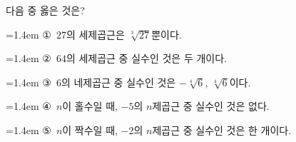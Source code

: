 다음 중 옳은 것은?
\par\medskip\par\noindent\hangindent=1.4em {\small ①}\ $27$의 세제곱근은 $\sqrt[3]{27}$뿐이다.\par\noindent\hangindent=1.4em {\small ②}\ $64$의 세제곱근 중 실수인 것은 두 개이다.\par\noindent\hangindent=1.4em {\small ③}\ $6$의 네제곱근 중 실수인 것은 $-\sqrt[4]{6}$, $\sqrt[4]{6}$이다.\par\noindent\hangindent=1.4em {\small ④}\ $n$이 홀수일 때, $-5$의 $n$제곱근 중 실수인 것은 없다.\par\noindent\hangindent=1.4em {\small ⑤}\ $n$이 짝수일 때, $-2$의 $n$제곱근 중 실수인 것은 한 개이다.\par\medskip
